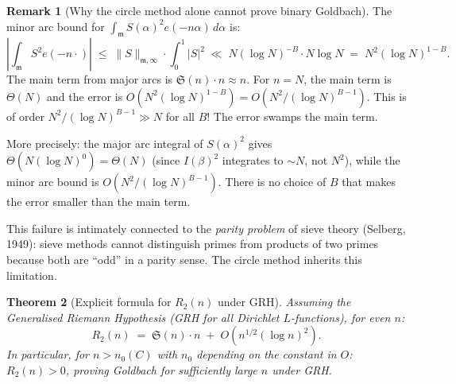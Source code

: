 \documentclass[12pt,a4paper]{amsart}
\newtheorem{theorem}{Theorem}[section]
\theoremstyle{definition}
\newtheorem{remark}[theorem]{Remark}
\newcommand{\eq}[1]{e\!\left(#1\right)}
\begin{document}
\begin{remark}[Why the circle method alone cannot prove binary Goldbach]
  The minor arc bound for $\int_{\mathfrak{m}} S(\alpha)^2 \eq{-n\alpha}\, d\alpha$
  is:
  \[
    \left|\int_{\mathfrak{m}} S^2 \eq{-n\cdot}\right|
    \;\leq\; \|S\|_{\mathfrak{m},\infty} \cdot \int_0^1 |S|^2
    \;\ll\; N (\log N)^{-B} \cdot N \log N
    \;=\; N^2 (\log N)^{1-B}.
  \]
  The main term from major arcs is $\mathfrak{S}(n) \cdot n \approx n$.
  For $n = N$, the main term is $\Theta(N)$ and the error is
  $O(N^2 (\log N)^{1-B}) = O(N^2 / (\log N)^{B-1})$.
  This is of order $N^2 / (\log N)^{B-1} \gg N$ for all $B$!
  The error swamps the main term.

  More precisely: the major arc integral of $S(\alpha)^2$ gives
  $\Theta(N (\log N)^0) = \Theta(N)$ (since $I(\beta)^2$ integrates to
  $\sim N$, not $N^2$), while the minor arc bound is $O(N^2/(\log N)^{B-1})$.
  There is no choice of $B$ that makes the error smaller than the main term.

  This failure is intimately connected to the \emph{parity problem} of sieve
  theory (Selberg, 1949): sieve methods cannot distinguish primes from
  products of two primes because both are ``odd'' in a parity sense.
  The circle method inherits this limitation.
\end{remark}

\begin{theorem}[Explicit formula for $R_2(n)$ under GRH]\label{thm:R2_GRH}
  Assuming the Generalised Riemann Hypothesis (GRH for all Dirichlet
  $L$-functions), for even $n$:
  \[
    R_2(n) \;=\; \mathfrak{S}(n) \cdot n
                 \;+\; O\!\left(n^{1/2} (\log n)^2\right).
  \]
  In particular, for $n > n_0(C)$ with $n_0$ depending on the constant in $O$:
  $R_2(n) > 0$, proving Goldbach for sufficiently large $n$ under GRH.
\end{theorem}
\end{document}
